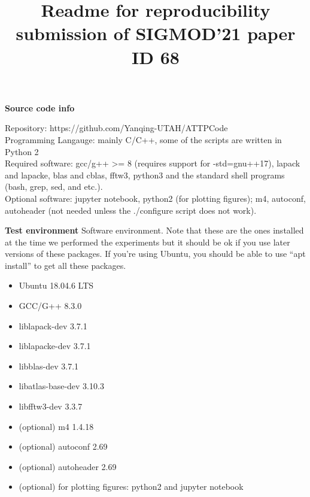 \documentclass[11pt]{article}
\title{Readme for reproducibility submission of SIGMOD'21 paper ID 68}
\author{}
\date{}
\newenvironment{pkl}{%
\begin{itemize}%
\setlength\itemsep{-0.5\parskip}%
\setlength\parsep{0in}%
}{%
\end{itemize}}
\begin{document}
\maketitle

{\bf Source code info}

Repository: https://github.com/Yanqing-UTAH/ATTPCode\\
Programming Langauge: mainly C/C++, some of the scripts are written in
Python 2\\
Required software: gcc/g++ >= 8 (requires support for -std=gnu++17),
lapack and lapacke, blas and cblas, fftw3, python3 and the standard
shell programs (bash, grep, sed, and etc.).\\
Optional software: jupyter notebook, python2 (for plotting
figures); m4, autoconf, autoheader (not needed unless the ./configure
script does not work).


{\bf Test environment}
Software environment. Note that these are the ones installed at the
time we performed the experiments but it should be ok if you use later
versions of these packages.  If you're using Ubuntu, you should be
able to use ``apt install'' to get all these packages.
\begin{pkl}
	\item Ubuntu 18.04.6 LTS
	\item GCC/G++ 8.3.0
	\item liblapack-dev 3.7.1
	\item liblapacke-dev 3.7.1
	\item libblas-dev 3.7.1
	\item libatlas-base-dev 3.10.3
	\item libfftw3-dev 3.3.7
	\item (optional) m4 1.4.18
	\item (optional) autoconf 2.69
	\item (optional) autoheader 2.69
	\item (optional) for plotting figures: python2 and jupyter
		notebook
\end{pkl}
\end{document}
